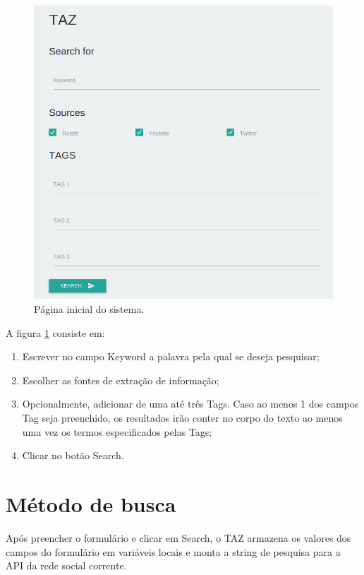 \begin{figure}[htb]
\centering
\includegraphics[width=1.0\textwidth]{images/home.png}
\caption{Página inicial do sistema.}
\label{fig: homepage}
\end{figure}

\newpage
A figura \ref{fig: homepage} consiste em:
\begin{enumerate}
    \item Escrever no campo Keyword a palavra pela qual se deseja pesquisar;
    \item Escolher as fontes de extração de informação;
    \item Opcionalmente, adicionar de uma até três Tags. Caso ao menos 1 dos campos Tag seja preenchido, os resultados irão conter no corpo do texto ao menos uma vez os termos especificados pelas Tags;
    \item Clicar no botão Search.
\end{enumerate}

\section{Método de busca}
\label{sec: MetodoDeBusca}
Após preencher o formulário e clicar em Search, o TAZ armazena os valores dos campos do formulário em variáveis locais e monta a string de pesquisa para a API da rede social corrente.

